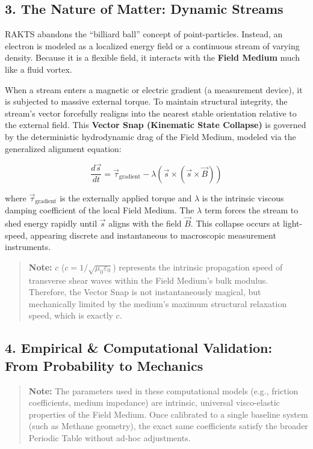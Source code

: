 \documentclass[
]{article}
\begin{document}
\subsection{3. The Nature of Matter: Dynamic
Streams}\label{the-nature-of-matter-dynamic-streams}

RAKTS abandons the ``billiard ball'' concept of point-particles.
Instead, an electron is modeled as a localized energy field or a
continuous stream of varying density. Because it is a flexible field, it
interacts with the \textbf{Field Medium} much like a fluid vortex.

When a stream enters a magnetic or electric gradient (a measurement
device), it is subjected to massive external torque. To maintain
structural integrity, the stream's vector forcefully realigns into the
nearest stable orientation relative to the external field. This
\textbf{Vector Snap (Kinematic State Collapse)} is governed by the
deterministic hydrodynamic drag of the Field Medium, modeled via the
generalized alignment equation:

\[ \frac{d\vec{s}}{dt} = \vec{\tau}_{\text{gradient}} - \lambda \left( \vec{s} \times (\vec{s} \times \vec{B}) \right) \]

where \(\vec{\tau}_{\text{gradient}}\) is the externally applied torque
and \(\lambda\) is the intrinsic viscous damping coefficient of the
local Field Medium. The \(\lambda\) term forces the stream to shed
energy rapidly until \(\vec{s}\) aligns with the field \(\vec{B}\). This
collapse occurs at light-speed, appearing discrete and instantaneous to
macroscopic measurement instruments.

\begin{quote}
\textbf{Note:} \(c\) (\(c = 1/\sqrt{\mu_0 \varepsilon_0}\)) represents
the intrinsic propagation speed of transverse shear waves within the
Field Medium's bulk modulus. Therefore, the Vector Snap is not
instantaneously magical, but mechanically limited by the medium's
maximum structural relaxation speed, which is exactly \(c\).
\end{quote}

\subsection{4. Empirical \& Computational Validation: From Probability
to
Mechanics}\label{empirical-computational-validation-from-probability-to-mechanics}

\begin{quote}
\textbf{Note:} The parameters used in these computational models (e.g.,
friction coefficients, medium impedance) are intrinsic, universal
visco-elastic properties of the Field Medium. Once calibrated to a
single baseline system (such as Methane geometry), the exact same
coefficients satisfy the broader Periodic Table without ad-hoc
adjustments.
\end{quote}
\end{document}
